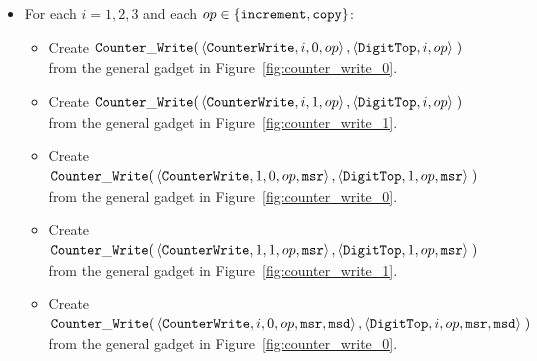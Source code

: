 \begin{itemize}
    \item For each $i = 1,2,3$ and each $op \in \{{\tt increment}, {\tt copy} \}$:
    \begin{itemize}
        \item Create
        $\begin{aligned}[t]
            {\tt Counter\_Write}(& \left\langle {\tt CounterWrite}, i, 0, op \right\rangle,
                      \left\langle {\tt DigitTop},     i,    op \right\rangle \;)
        \end{aligned}$ \\ from the general gadget in Figure~\ref{fig:counter_write_0}.

        \item Create
        $\begin{aligned}[t]
            {\tt Counter\_Write}(& \left\langle {\tt CounterWrite}, i, 1, op \right\rangle,
                      \left\langle {\tt DigitTop},     i,    op \right\rangle \;)
        \end{aligned}$ \\ from the general gadget in Figure~\ref{fig:counter_write_1}.

        \item Create
        $\begin{aligned}[t]
            {\tt Counter\_Write}(& \left\langle {\tt CounterWrite}, 1, 0, op, {\tt msr} \right\rangle,
                      \left\langle {\tt DigitTop},     1,    op, {\tt msr} \right\rangle \;)
        \end{aligned}$ \\ from the general gadget in Figure~\ref{fig:counter_write_0}.

        \item Create
        $\begin{aligned}[t]
            {\tt Counter\_Write}(& \left\langle {\tt CounterWrite}, 1, 1, op, {\tt msr} \right\rangle,
                      \left\langle {\tt DigitTop},     1,    op, {\tt msr} \right\rangle \;)
        \end{aligned}$ \\ from the general gadget in Figure~\ref{fig:counter_write_1}.

        \item Create
        $\begin{aligned}[t]
            {\tt Counter\_Write}(& \left\langle {\tt CounterWrite}, i, 0, op, {\tt msr}, {\tt msd} \right\rangle,
                      \left\langle {\tt DigitTop},     i,    op, {\tt msr}, {\tt msd} \right\rangle \;)
        \end{aligned}$ \\ from the general gadget in Figure~\ref{fig:counter_write_0}.


\end{itemize}
\end{itemize}
